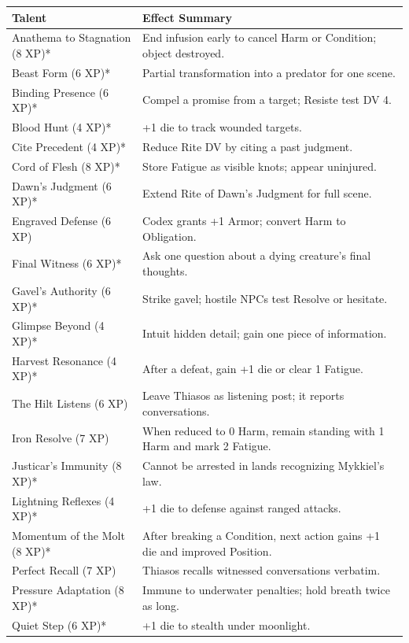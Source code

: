 \begin{longtable}{p{} p{}}
\hline
\textbf{Talent} & \textbf{Effect Summary} \\
\hline
Anathema to Stagnation (8 XP)* & End infusion early to cancel Harm or Condition; object destroyed. \\
Beast Form (6 XP)* & Partial transformation into a predator for one scene. \\
Binding Presence (6 XP)* & Compel a promise from a target; Resiste test DV 4. \\
Blood Hunt (4 XP)* & +1 die to track wounded targets. \\
Cite Precedent (4 XP)* & Reduce Rite DV by citing a past judgment. \\
Cord of Flesh (8 XP)* & Store Fatigue as visible knots; appear uninjured. \\
Dawn's Judgment (6 XP)* & Extend Rite of Dawn's Judgment for full scene. \\
Engraved Defense (6 XP) & Codex grants +1 Armor; convert Harm to Obligation. \\
Final Witness (6 XP)* & Ask one question about a dying creature's final thoughts. \\
Gavel's Authority (6 XP)* & Strike gavel; hostile NPCs test Resolve or hesitate. \\
Glimpse Beyond (4 XP)* & Intuit hidden detail; gain one piece of information. \\
Harvest Resonance (4 XP)* & After a defeat, gain +1 die or clear 1 Fatigue. \\
The Hilt Listens (6 XP) & Leave Thiasos as listening post; it reports conversations. \\
Iron Resolve (7 XP) & When reduced to 0 Harm, remain standing with 1 Harm and mark 2 Fatigue. \\
Justicar's Immunity (8 XP)* & Cannot be arrested in lands recognizing Mykkiel's law. \\
Lightning Reflexes (4 XP)* & +1 die to defense against ranged attacks. \\
Momentum of the Molt (8 XP)* & After breaking a Condition, next action gains +1 die and improved Position. \\
Perfect Recall (7 XP) & Thiasos recalls witnessed conversations verbatim. \\
Pressure Adaptation (8 XP)* & Immune to underwater penalties; hold breath twice as long. \\
Quiet Step (6 XP)* & +1 die to stealth under moonlight. \\

\end{longtable}
